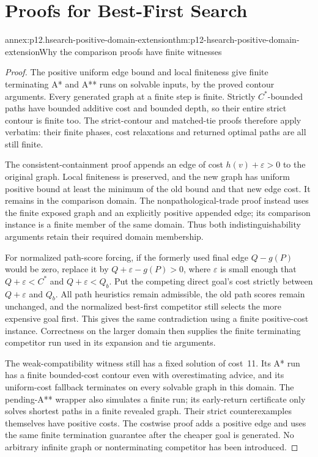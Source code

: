 \chapter{Proofs for Best-First Search}
\label{annex:p12-heuristic-search}

\begin{annexitem}{annex:p12.hsearch-positive-domain-extension}{thm:p12-hsearch-positive-domain-extension}{Why the comparison proofs have finite witnesses}
\begin{proof}
The positive uniform edge bound and local finiteness give finite
terminating A* and A** runs on solvable inputs, by the proved contour
arguments. Every generated graph at a finite step is finite. Strictly
\(C^*\)-bounded paths have bounded additive cost and bounded depth,
so their entire strict contour is finite too. The strict-contour and
matched-tie proofs therefore apply verbatim: their finite phases, cost
relaxations and returned optimal paths are all still finite.

The consistent-containment proof appends an edge of cost
\(h(v)+\varepsilon>0\) to the original graph. Local finiteness is
preserved, and the new graph has uniform positive bound at least the
minimum of the old bound and that new edge cost. It remains in the
comparison domain. The nonpathological-trade proof instead uses the
finite exposed graph and an explicitly positive appended edge; its
comparison instance is a finite member of the same domain. Thus both
indistinguishability arguments retain their required domain membership.

For normalized path-score forcing, if the formerly used final edge
\(Q-g(P)\) would be zero, replace it by
\(Q+\varepsilon-g(P)>0\), where \(\varepsilon\) is small
enough that \(Q+\varepsilon<C^*\) and
\(Q+\varepsilon<Q_b\). Put the competing direct goal's cost
strictly between \(Q+\varepsilon\) and \(Q_b\).
All path heuristics remain admissible, the old path scores remain
unchanged, and the normalized best-first competitor still selects the
more expensive goal first. This gives the same contradiction using a
finite positive-cost instance. Correctness on the larger domain then
supplies the finite terminating competitor run used in its expansion
and tie arguments.

The weak-compatibility witness still has a fixed solution of cost~11.
Its A* run has a finite bounded-cost contour even with overestimating
advice, and its uniform-cost fallback terminates on every solvable graph
in this domain. The pending-A** wrapper also simulates a finite run;
its early-return certificate only solves shortest paths in a finite
revealed graph. Their strict counterexamples themselves have positive
costs. The costwise proof adds a positive edge and uses the same finite
termination guarantee after the cheaper goal is generated. No arbitrary
infinite graph or nonterminating competitor has been introduced.


\end{proof}
\end{annexitem}
